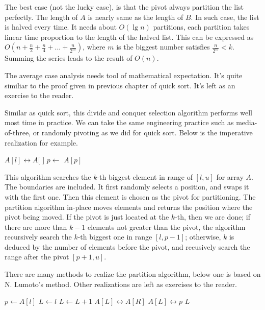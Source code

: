 \documentclass{article}
\begin{document}
The best case (not the lucky case), is that the pivot always partition the list perfectly.
The length of $A$ is nearly same as the length of $B$. In such case, the list is halved
every time. It needs about $O(\lg n)$ partitions, each partition takes linear time proportion
to the length of the halved list. This can be expressed as 
$O(n + \frac{n}{2} + \frac{n}{4} + ... + \frac{n}{2^m})$, where $m$ is the biggest number satisfies
$\frac{n}{2^m} < k$. Summing the series leads to the result of $O(n)$.

The average case analysis needs tool of mathematical expectation. It's quite similiar to the
proof given in previous chapter of quick sort. It's left as an exercise to the reader.

Similar as quick sort, this divide and conquer selection algorithm performs well most time
in practice. We can take the same engineering practice such as media-of-three, or randomly
pivoting as we did for quick sort. Below is the imperative realization for example.

\begin{algorithmic}[1]
  \State {} $A[l] \leftrightarrow A[$  $]$ 
  \State $p \gets$ 
    \State \Return $A[p]$
    \State \Return {}
  \Else
    \State \Return {}
  \EndIf
\EndFunction
\end{algorithmic}

This algorithm searches the $k$-th biggest element in range of $[l, u]$ for array $A$. The boundaries
are included. It first randomly selects a position, and swaps it with the first one. Then this element
is chosen as the pivot for partitioning. The partition algorithm in-place moves elements and 
returns the position where the pivot being moved. If the pivot is just located at the $k$-th, then
we are done; if there are more than $k-1$ elements not greater than the pivot, the algorithm 
recursively search the $k$-th biggest one in range $[l, p-1]$; otherwise, $k$ is deduced by the
number of elements before the pivot, and recusively search the range after the pivot $[p+1, u]$.

There are many methods to realize the partition algorithm, below one is based on N. Lumoto's method.
Other realizations are left as exercises to the reader.

\begin{algorithmic}[1]
  \State $p \gets A[l]$ 
  \State $L \gets l$ 
      \State $L \gets L + 1$
      \State {} $A[L] \leftrightarrow A[R]$
    \EndIf
  \EndFor
  \State {} $A[L] \leftrightarrow p$
  \State \Return $L$
\EndFunction
\end{algorithmic}
\end{document}

